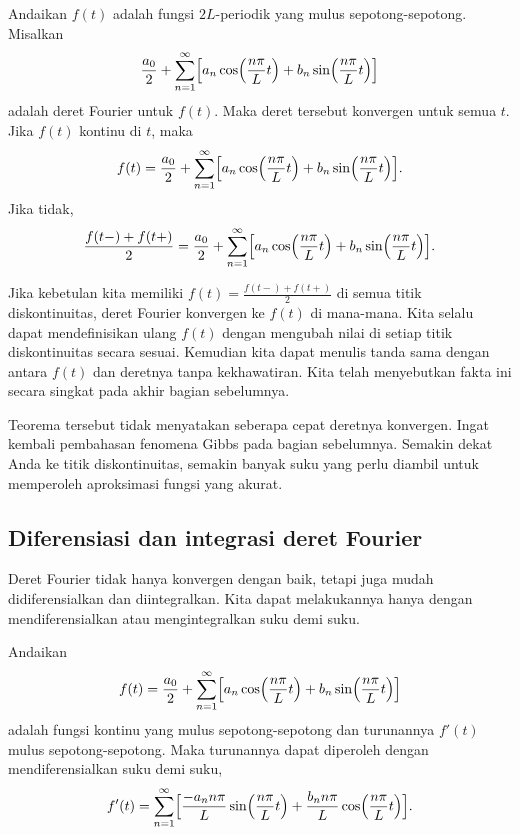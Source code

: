 \begin{theorem}
Andaikan $f(t)$ adalah fungsi $2L$-periodik yang mulus sepotong-sepotong.
Misalkan
\begin{equation*}
\frac{a_0}{2} + \sum_{n=1}^\infty
\Bigl[
a_n \cos \Bigl( \frac{n \pi}{L} t \Bigr)
+ b_n \sin \Bigl( \frac{n \pi}{L} t \Bigr)
\Bigr]
\end{equation*}
adalah deret Fourier untuk $f(t)$.  Maka deret tersebut konvergen
untuk semua $t$.  Jika $f(t)$ kontinu
di $t$, maka
\begin{equation*}
f(t) = \frac{a_0}{2} + \sum_{n=1}^\infty
\Bigl[
a_n \cos \Bigl( \frac{n \pi}{L} t \Bigr)
+ b_n \sin \Bigl( \frac{n \pi}{L} t \Bigr)
\Bigr] .
\end{equation*}
Jika tidak,
\begin{equation*}
\frac{f(t-)+f(t+)}{2} =
\frac{a_0}{2} + \sum_{n=1}^\infty
\Bigl[
a_n \cos \Bigl( \frac{n \pi}{L}  t \Bigr)
+ b_n \sin \Bigl( \frac{n \pi}{L} t \Bigr)
\Bigr] .
\end{equation*}
\end{theorem}

Jika kebetulan kita memiliki
$f(t) = \frac{f(t-)+f(t+)}{2}$ di semua titik diskontinuitas, deret Fourier
konvergen ke $f(t)$ di mana-mana.  Kita selalu dapat mendefinisikan ulang $f(t)$
dengan mengubah nilai di setiap titik diskontinuitas secara sesuai.  Kemudian kita dapat menulis
tanda sama dengan antara $f(t)$ dan deretnya tanpa kekhawatiran.
Kita telah menyebutkan fakta ini
secara singkat pada akhir bagian sebelumnya.

Teorema tersebut tidak menyatakan seberapa cepat deretnya konvergen.
Ingat kembali pembahasan fenomena Gibbs pada bagian sebelumnya.
Semakin dekat Anda ke titik diskontinuitas, semakin banyak suku yang perlu diambil
untuk memperoleh aproksimasi fungsi yang akurat.

\subsection{Diferensiasi dan integrasi deret Fourier}

Deret Fourier tidak hanya konvergen dengan baik, tetapi juga mudah didiferensialkan
dan diintegralkan.  Kita dapat melakukannya hanya dengan mendiferensialkan atau
mengintegralkan suku demi suku.

\begin{theorem}
Andaikan
\begin{equation*}
f(t) = \frac{a_0}{2} +
\sum_{n=1}^\infty
\Bigl[
a_n \cos \Bigl( \frac{n \pi}{L} t \Bigr)
+ b_n \sin \Bigl( \frac{n \pi}{L} t \Bigr)
\Bigr]
\end{equation*}
adalah fungsi kontinu yang mulus sepotong-sepotong dan turunannya $f'(t)$
mulus sepotong-sepotong.  Maka turunannya dapat
diperoleh dengan mendiferensialkan suku demi suku,
\begin{equation*}
f'(t) = \sum_{n=1}^\infty
\Bigl[
\frac{-a_n n \pi}{L} 
\sin \Bigl( \frac{n \pi}{L} t \Bigr)
+ \frac{b_n n \pi}{L} \cos \Bigl( \frac{n \pi}{L} t \Bigr)
\Bigr] .
\end{equation*}
\end{theorem}

